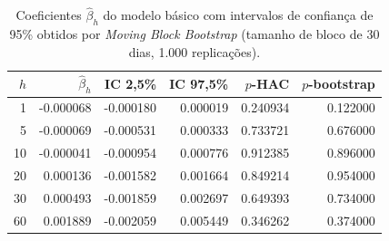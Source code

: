 \begin{table}[H]
\centering
\caption{Coeficientes $\hat{\beta}_h$ do modelo básico com intervalos de
confiança de 95\% obtidos por \textit{Moving Block Bootstrap}
(tamanho de bloco de 30 dias, 1.000 replicações).}
\label{tab:cap5-bootstrap}
\begin{tabular}{rrrrrr}
\toprule
$h$ & $\hat{\beta}_h$ & IC 2{,}5\% & IC 97{,}5\% & $p$-HAC & $p$-bootstrap \\
\midrule
      1 & -0.000068 & -0.000180 & 0.000019 & 0.240934 & 0.122000 \\
      5 & -0.000069 & -0.000531 & 0.000333 & 0.733721 & 0.676000 \\
     10 & -0.000041 & -0.000954 & 0.000776 & 0.912385 & 0.896000 \\
     20 & 0.000136 & -0.001582 & 0.001664 & 0.849214 & 0.954000 \\
     30 & 0.000493 & -0.001859 & 0.002697 & 0.649393 & 0.734000 \\
     60 & 0.001889 & -0.002059 & 0.005449 & 0.346262 & 0.374000 \\
\bottomrule
\end{tabular}
\end{table}
